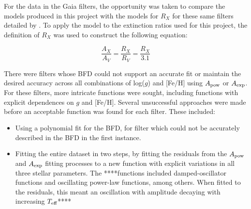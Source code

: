 \documentclass[12pt, a4paper]{report}
\begin{document}
For the data in the Gaia filters, the opportunity was taken to compare the models produced in this project with the models for $R_{X}$ for these same filters detailed by \cite{2018MNRAS.479L.102C}. To apply the \cite{2018MNRAS.479L.102C} model to the extinction ratios used for this project, the definition of $R_{X}$ was used to construct the following equation:

\begin{equation}
\frac{A_{X}}{A_{V}} = \frac{R_{X}}{R_{V}} = \frac{R_{X}}{3.1}
\label{convert_Rx_to_Ax}
\end{equation}

There were filters whose BFD could not support an accurate fit or maintain the desired accuracy across all combinations of log($g$) and [Fe/H] using $A_{\textnormal{pow}}$ or $A_{\textnormal{exp}}$. For these filters, more intricate functions were sought, including functions with explicit dependences on $g$ and [Fe/H]. Several unsuccessful approaches were made before an acceptable function was found for each filter. These included:

\begin{itemize}
\item Using a polynomial fit for the BFD, for filter which could not be accurately described in the BFD in the first instance.
\item Fitting the entire dataset in two steps, by fitting the residuals from the $A_{\textnormal{pow}}$ and $A_{\textnormal{exp}}$ fitting processes to a new function with explicit variations in all three stellar parameters. The ****functions included damped-oscillator functions and oscillating power-law functions, among others. When fitted to the residuals, this meant an oscillation with amplitude decaying with increasing $T_{\textnormal{eff}}$****
\end{itemize}
\end{document}
